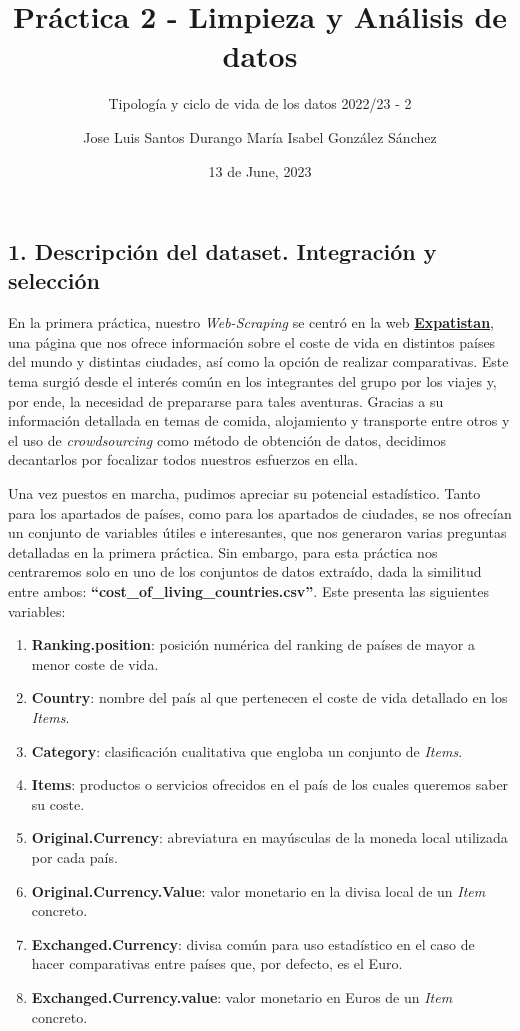 \documentclass[
]{article}
\title{Práctica 2 - Limpieza y Análisis de datos}
\subtitle{Tipología y ciclo de vida de los datos \textbar{} 2022/23 - 2}
\author{Jose Luis Santos Durango \textbar{} María Isabel González
Sánchez}
\date{13 de June, 2023}
\begin{document}
\maketitle

{
\setcounter{tocdepth}{4}
\tableofcontents
}
\newpage

\hypertarget{descripciuxf3n-del-dataset.-integraciuxf3n-y-selecciuxf3n}{%
\subsection{1. Descripción del dataset. Integración y
selección}\label{descripciuxf3n-del-dataset.-integraciuxf3n-y-selecciuxf3n}}

En la primera práctica, nuestro \emph{Web-Scraping} se centró en la web
\href{https://www.expatistan.com/check/humanity}{\textbf{Expatistan}},
una página que nos ofrece información sobre el coste de vida en
distintos países del mundo y distintas ciudades, así como la opción de
realizar comparativas. Este tema surgió desde el interés común en los
integrantes del grupo por los viajes y, por ende, la necesidad de
prepararse para tales aventuras. Gracias a su información detallada en
temas de comida, alojamiento y transporte entre otros y el uso de
\emph{crowdsourcing} como método de obtención de datos, decidimos
decantarlos por focalizar todos nuestros esfuerzos en ella.

Una vez puestos en marcha, pudimos apreciar su potencial estadístico.
Tanto para los apartados de países, como para los apartados de ciudades,
se nos ofrecían un conjunto de variables útiles e interesantes, que nos
generaron varias preguntas detalladas en la primera práctica. Sin
embargo, para esta práctica nos centraremos solo en uno de los conjuntos
de datos extraído, dada la similitud entre ambos:
\textbf{``cost\_of\_living\_countries.csv''}. Este presenta las
siguientes variables:

\begin{enumerate}
\def\labelenumi{\arabic{enumi}.}
\item
  \textbf{Ranking.position}: posición numérica del ranking de países de
  mayor a menor coste de vida.
\item
  \textbf{Country}: nombre del país al que pertenecen el coste de vida
  detallado en los \emph{Items}.
\item
  \textbf{Category}: clasificación cualitativa que engloba un conjunto
  de \emph{Items}.
\item
  \textbf{Items}: productos o servicios ofrecidos en el país de los
  cuales queremos saber su coste.
\item
  \textbf{Original.Currency}: abreviatura en mayúsculas de la moneda
  local utilizada por cada país.
\item
  \textbf{Original.Currency.Value}: valor monetario en la divisa local
  de un \emph{Item} concreto.
\item
  \textbf{Exchanged.Currency}: divisa común para uso estadístico en el
  caso de hacer comparativas entre países que, por defecto, es el Euro.
\item
  \textbf{Exchanged.Currency.value}: valor monetario en Euros de un
  \emph{Item} concreto.
\end{enumerate}
\end{document}
